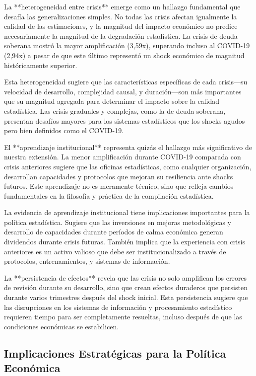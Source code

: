 \documentclass[12pt,a4paper]{article}
\begin{document}
La **heterogeneidad entre crisis** emerge como un hallazgo fundamental que desafía las generalizaciones simples. No todas las crisis afectan igualmente la calidad de las estimaciones, y la magnitud del impacto económico no predice necesariamente la magnitud de la degradación estadística. La crisis de deuda soberana mostró la mayor amplificación (3,59x), superando incluso al COVID-19 (2,94x) a pesar de que este último representó un shock económico de magnitud históricamente superior.

Esta heterogeneidad sugiere que las características específicas de cada crisis—su velocidad de desarrollo, complejidad causal, y duración—son más importantes que su magnitud agregada para determinar el impacto sobre la calidad estadística. Las crisis graduales y complejas, como la de deuda soberana, presentan desafíos mayores para los sistemas estadísticos que los shocks agudos pero bien definidos como el COVID-19.

El **aprendizaje institucional** representa quizás el hallazgo más significativo de nuestra extensión. La menor amplificación durante COVID-19 comparada con crisis anteriores sugiere que las oficinas estadísticas, como cualquier organización, desarrollan capacidades y protocolos que mejoran su resiliencia ante shocks futuros. Este aprendizaje no es meramente técnico, sino que refleja cambios fundamentales en la filosofía y práctica de la compilación estadística.

La evidencia de aprendizaje institucional tiene implicaciones importantes para la política estadística. Sugiere que las inversiones en mejoras metodológicas y desarrollo de capacidades durante períodos de calma económica generan dividendos durante crisis futuras. También implica que la experiencia con crisis anteriores es un activo valioso que debe ser institucionalizado a través de protocolos, entrenamientos, y sistemas de información.

La **persistencia de efectos** revela que las crisis no solo amplifican los errores de revisión durante su desarrollo, sino que crean efectos duraderos que persisten durante varios trimestres después del shock inicial. Esta persistencia sugiere que las disrupciones en los sistemas de información y procesamiento estadístico requieren tiempo para ser completamente resueltas, incluso después de que las condiciones económicas se estabilicen.

\subsection{Implicaciones Estratégicas para la Política Económica}
\end{document}
